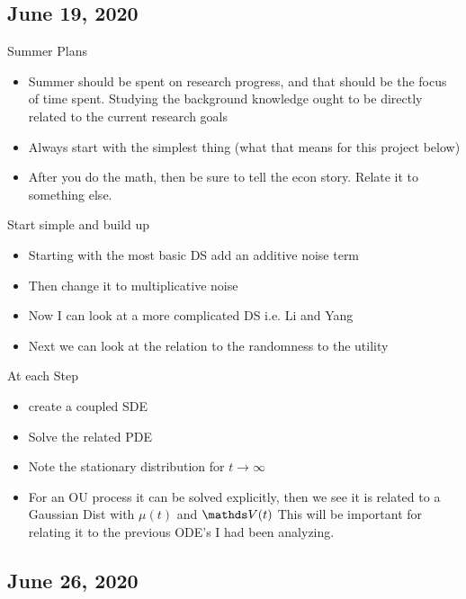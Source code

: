 \subsection{June 19, 2020}
Summer Plans
\begin{itemize}
	\item Summer should be spent on research progress, and that should be the focus of time spent. Studying the background knowledge ought to be directly related to the current research goals
	\item Always start with the simplest thing (what that means for this project below)
	\item After you do the math, then be sure to tell the econ story. Relate it to something else.
\end{itemize}\enter
Start simple and build up
\begin{itemize}
	\item Starting with the most basic DS add an additive noise term
	\item Then change it to multiplicative noise
	\item Now I can look at a more complicated DS i.e. Li and Yang
	\item Next we can look at the relation to the randomness to the utility
\end{itemize}\enter
At each Step 
\begin{itemize}
	\item create a coupled SDE
	\item Solve the related PDE
	\item Note the stationary distribution for $t\rightarrow\infty$
	\item For an OU process it can be solved explicitly, then we see it is related to a Gaussian Dist with $\mu(t)$ and $\Vb(t)$
	This will be important for relating it to the previous ODE's I had been analyzing.
\end{itemize}


\subsection{June 26, 2020}

